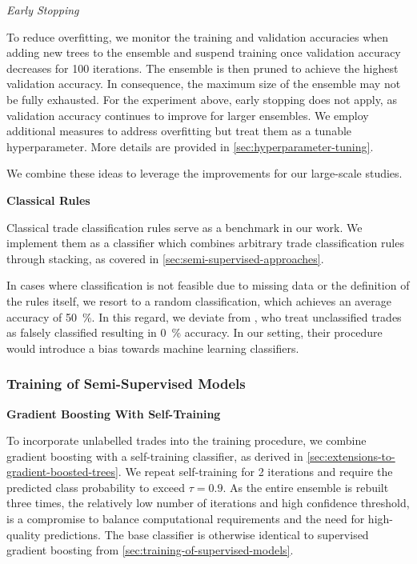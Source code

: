 \emph{Early Stopping}

To reduce overfitting, we monitor the training and validation accuracies when adding new trees to the ensemble and suspend training once validation accuracy decreases for 100 iterations. The ensemble is then pruned to achieve the highest validation accuracy. In consequence, the maximum size of the ensemble may not be fully exhausted. For the experiment above, early stopping does not apply, as validation accuracy continues to improve for larger ensembles. We employ additional measures to address overfitting but treat them as a tunable hyperparameter. More details are provided in \cref{sec:hyperparameter-tuning}.

We combine these ideas to leverage the improvements for our large-scale studies.

\textbf{Classical Rules}

Classical trade classification rules serve as a benchmark in our work. We implement them as a classifier which combines arbitrary trade classification rules through stacking, as covered in \cref{sec:semi-supervised-approaches}. 

In cases where classification is not feasible due to missing data or the definition of the rules itself, we resort to a random classification, which achieves an average accuracy of \SI{50}{\percent}. In this regard, we deviate from \textcite[][29--32]{grauerOptionTradeClassification2022}, who treat unclassified trades as falsely classified resulting in \SI{0}{\percent} accuracy. In our setting, their procedure would introduce a bias towards machine learning classifiers.

\subsubsection{Training of Semi-Supervised
    Models}\label{sec:training-of-semi-supervised-models}

\textbf{Gradient Boosting With Self-Training}

To incorporate unlabelled trades into the training procedure, we combine gradient boosting with a self-training classifier, as derived in \cref{sec:extensions-to-gradient-boosted-trees}. We repeat self-training for 2 iterations and require the predicted class probability to exceed $\tau=0.9$. As the entire ensemble is rebuilt three times, the relatively low number of iterations and high confidence threshold, is a compromise to balance computational requirements and the need for high-quality predictions. The base classifier is otherwise identical to supervised gradient boosting from \cref{sec:training-of-supervised-models}.

